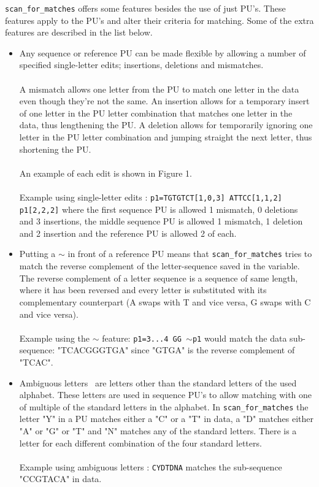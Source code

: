 \documentclass[12pt]{article}
\newcommand{\scm}{\texttt{scan\_for\_matches} }
\newcommand{\pu}{PU }
\newcommand{\pus}{PU's }
\newcommand{\pusp}{PU's. }
\newcommand{\pup}{PU. }
\begin{document}
\scm offers some features besides the use of just \pusp These features apply to the \pus and alter their criteria
for matching.
Some of the extra features are described in the list below.
\begin{itemize}
\item Any sequence or reference \pu can be made flexible by allowing a number of specified
single-letter edits; insertions, deletions and mismatches. \\ \\
A mismatch allows one letter from the \pu to match one letter in the data even though they're not the same.
An insertion allows for a temporary insert of one letter in the \pu letter combination that matches one letter in
the data, thus lengthening the \pup A deletion allows for temporarily ignoring one letter in the \pu letter combination
and jumping straight the next letter, thus shortening the \pup \\ \\
An example of each edit is shown in Figure 1. \\ \\
Example using single-letter edits : \texttt{p1=TGTGTCT[1,0,3]\; ATTCC[1,1,2]\; p1[2,2,2]} 
where the first sequence \pu is allowed 1 mismatch, 0
deletions and 3 insertions, the middle sequence \pu is allowed 1 mismatch, 1 deletion and 2 insertion 
and the reference \pu is allowed 2 of each.
\item Putting a $\sim$ in front of a reference \pu means that \scm tries to match the reverse 
complement of the letter-sequence saved in the variable. 
The reverse complement of a letter sequence is a sequence of same length, where it has been reversed and every letter
is substituted with its complementary counterpart (A swaps with T and vice versa, G swaps with C and vice versa).\\ \\
Example using the $\sim$ feature: \texttt{p1=3...4\; GG\; $\sim$p1} would match the data sub-sequence:
"TCACGGGTGA" since "GTGA" is the reverse complement of "TCAC".
\item Ambiguous letters~\cite{ambi} are letters other than the standard letters of the used alphabet. These letters are used
in sequence \pus to allow matching with one of multiple of the standard letters in the alphabet.
In \scm the letter "Y" in a \pu matches either a "C" or a "T" in data, a "D" matches either "A" or "G" or "T" 
and "N" matches any of the standard letters. There is a letter for each different combination of the
four standard letters. \\ \\
Example using ambiguous letters : \texttt{CYDTDNA} matches the sub-sequence "CCGTACA" in data.
\end{itemize}
\end{document}
